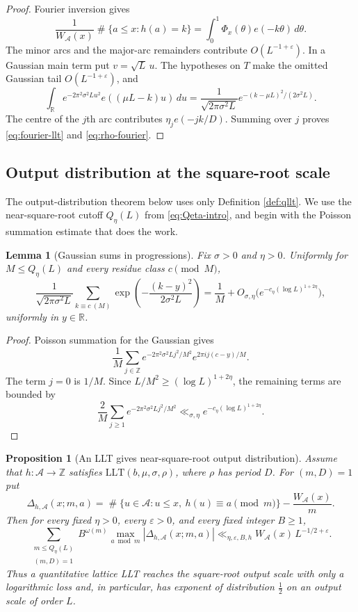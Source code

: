 \documentclass[11pt,reqno]{amsart}
\theoremstyle{plain}
\newtheorem{lemma}[theorem]{Lemma}
\newtheorem{proposition}[theorem]{Proposition}
\theoremstyle{definition}
\newcommand{\Z}{\mathbb{Z}}
\newcommand{\R}{\mathbb{R}}
\newcommand{\eps}{\varepsilon}
\newcommand{\ee}[1]{e\!\left(#1\right)}
\newcommand{\1}{\mathbf 1}
\DeclareMathOperator{\Card}{\#}
\begin{document}
\begin{proof}
Fourier inversion gives
\[
 \frac1{W_{\mathcal A}(x)}\Card\{a\le x:h(a)=k\}
 =\int_0^1\Phi_x(\theta)\ee{-k\theta}\,d\theta.
\]
The minor arcs and the major-arc remainders contribute $O(L^{-1+\eps})$.  In a Gaussian main term put $v=\sqrt L\,u$.  The hypotheses on $T$ make the omitted Gaussian tail $O(L^{-1+\eps})$, and
\[
 \int_{\R}e^{-2\pi^2\sigma^2Lu^2}\ee{(\mu L-k)u}\,du
 =\frac1{\sqrt{2\pi\sigma^2L}}
 e^{-(k-\mu L)^2/(2\sigma^2L)}.
\]
The centre of the $j$th arc contributes $\eta_j\ee{-jk/D}$.  Summing over $j$ proves \eqref{eq:fourier-llt} and \eqref{eq:rho-fourier}.
\end{proof}

\subsection{Output distribution at the square-root scale}
The output-distribution theorem below uses only Definition \ref{def:qllt}.  We use the near-square-root cutoff $Q_\eta(L)$ from \eqref{eq:Qeta-intro}, and begin with the Poisson summation estimate that does the work.

\begin{lemma}[Gaussian sums in progressions]\label{lem:gaussian-progression}
Fix $\sigma>0$ and $\eta>0$.  Uniformly for $M\le Q_\eta(L)$ and every residue class $c\pmod M$,
\[
 \frac1{\sqrt{2\pi\sigma^2L}}
 \sum_{k\equiv c\ (M)}
 \exp\left(-\frac{(k-y)^2}{2\sigma^2L}\right)
 =\frac1M+O_{\sigma,\eta}\bigl(e^{-c_\eta(\log L)^{1+2\eta}}\bigr),
\]
uniformly in $y\in\R$.
\end{lemma}

\begin{proof}
Poisson summation for the Gaussian gives
\[
 \frac1M\sum_{j\in\Z}
 e^{-2\pi^2\sigma^2Lj^2/M^2}e^{2\pi ij(c-y)/M}.
\]
The term $j=0$ is $1/M$.  Since $L/M^2\ge(\log L)^{1+2\eta}$, the remaining terms are bounded by
\[
 \frac2M\sum_{j\ge1}e^{-2\pi^2\sigma^2Lj^2/M^2}
 \ll_{\sigma,\eta} e^{-c_\eta(\log L)^{1+2\eta}}.
\]
\end{proof}

\begin{proposition}[An LLT gives near-square-root output distribution]\label{prop:llt-output-level}
Assume that $h:\mathcal A\to\Z$ satisfies $\mathrm{LLT}(b,\mu,\sigma,\rho)$, where $\rho$ has period $D$.  For $(m,D)=1$ put
\[
 \Delta_{h,\mathcal A}(x;m,a)
 =\Card\{u\in\mathcal A:u\le x,\ h(u)\equiv a\pmod m\}
 -\frac{W_{\mathcal A}(x)}m.
\]
Then for every fixed $\eta>0$, every $\eps>0$, and every fixed integer $B\ge1$,
\begin{equation}\label{eq:abstract-output-level}
 \sum_{\substack{m\le Q_\eta(L)\\(m,D)=1}}
 B^{\omega(m)}\max_{a\bmod m}|\Delta_{h,\mathcal A}(x;m,a)|
 \ll_{\eta,\eps,B,h} W_{\mathcal A}(x)\,L^{-1/2+\eps}.
\end{equation}
Thus a quantitative lattice LLT reaches the square-root output scale with only a logarithmic loss and, in particular, has exponent of distribution $\tfrac12$ on an output scale of order $L$.
\end{proposition}
\end{document}
